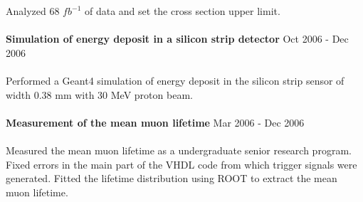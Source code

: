\documentclass[margin]{res}
\begin{document}
\begin{resume}
      Analyzed 68 $fb^{-1}$ of data and set the cross section upper limit.
      \\
      \\
\textbf{Simulation of energy deposit in a silicon strip detector}  
      \hfill Oct 2006 - Dec 2006
      \\
      \\
       Performed a Geant4 simulation of energy deposit in the silicon strip sensor of 
       width 0.38 mm with 30 MeV proton beam.  
      \\
      \\
\textbf{Measurement of the mean muon lifetime}  
      \hfill Mar 2006 - Dec 2006
      \\
      \\
      Measured the mean muon lifetime as a undergraduate senior research program.
      Fixed errors in the main part of the VHDL code from which trigger signals were generated. 
      Fitted the lifetime distribution using ROOT to extract the mean muon lifetime. 




\end{resume} 
\end{document}
